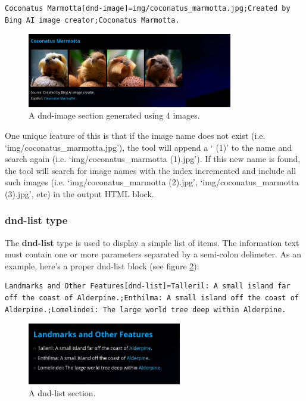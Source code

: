 \begin{lstlisting}
Coconatus Marmotta[dnd-image]=img/coconatus_marmotta.jpg;Created by Bing AI image creator;Coconatus Marmotta.
\end{lstlisting}

\begin{figure}[h]
	\centering
	\includegraphics[width=0.8\textwidth]{images/dnd-image-section.png}
	\caption{A dnd-image section generated using 4 images.}
	\label{fig:dnd-image-fig}
\end{figure}

One unique feature of this is that if the image name does not exist (i.e. `img/coconatus\_marmotta.jpg'), the tool will append a ` (1)' to the name and search again (i.e. `img/coconatus\_marmotta (1).jpg'). If this new name is found, the tool will search for image names with the index incremented and include all such images (i.e. `img/coconatus\_marmotta (2).jpg', `img/coconatus\_marmotta (3).jpg', etc) in the output HTML block.  

\subsubsection{dnd-list type}

The \textbf{dnd-list} type is used to display a simple list of items. The information text must contain one or more parameters separated by a semi-colon delimeter. As an example, here's a proper dnd-list block (see figure \ref{fig:dnd-list-fig}):

\begin{lstlisting}
Landmarks and Other Features[dnd-list]=Talleril: A small island far off the coast of Alderpine.;Enthilma: A small island off the coast of Alderpine.;Lomelindei: The large world tree deep within Alderpine.
\end{lstlisting}

\begin{figure}[h]
	\centering
	\includegraphics[width=0.6\textwidth]{images/dnd-list-section.png}
	\caption{A dnd-list section.}
	\label{fig:dnd-list-fig}
\end{figure}

